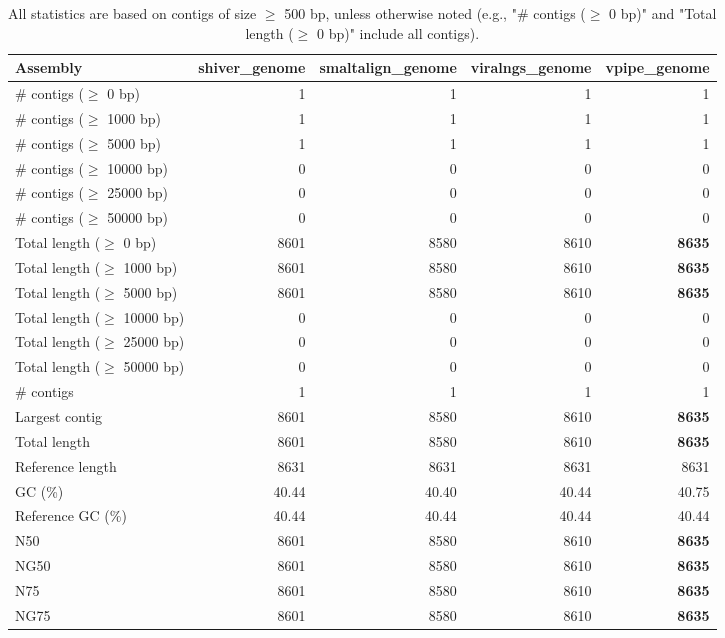 \documentclass[12pt,a4paper]{article}
\begin{document}
\begin{table}[ht]
\begin{center}
\caption{All statistics are based on contigs of size $\geq$ 500 bp, unless otherwise noted (e.g., "\# contigs ($\geq$ 0 bp)" and "Total length ($\geq$ 0 bp)" include all contigs).}
\begin{tabular}{|l*{4}{|r}|}
\hline
Assembly & shiver\_genome & smaltalign\_genome & viralngs\_genome & vpipe\_genome \\ \hline
\# contigs ($\geq$ 0 bp) & 1 & 1 & 1 & 1 \\ \hline
\# contigs ($\geq$ 1000 bp) & 1 & 1 & 1 & 1 \\ \hline
\# contigs ($\geq$ 5000 bp) & 1 & 1 & 1 & 1 \\ \hline
\# contigs ($\geq$ 10000 bp) & 0 & 0 & 0 & 0 \\ \hline
\# contigs ($\geq$ 25000 bp) & 0 & 0 & 0 & 0 \\ \hline
\# contigs ($\geq$ 50000 bp) & 0 & 0 & 0 & 0 \\ \hline
Total length ($\geq$ 0 bp) & 8601 & 8580 & 8610 & {\bf 8635} \\ \hline
Total length ($\geq$ 1000 bp) & 8601 & 8580 & 8610 & {\bf 8635} \\ \hline
Total length ($\geq$ 5000 bp) & 8601 & 8580 & 8610 & {\bf 8635} \\ \hline
Total length ($\geq$ 10000 bp) & 0 & 0 & 0 & 0 \\ \hline
Total length ($\geq$ 25000 bp) & 0 & 0 & 0 & 0 \\ \hline
Total length ($\geq$ 50000 bp) & 0 & 0 & 0 & 0 \\ \hline
\# contigs & 1 & 1 & 1 & 1 \\ \hline
Largest contig & 8601 & 8580 & 8610 & {\bf 8635} \\ \hline
Total length & 8601 & 8580 & 8610 & {\bf 8635} \\ \hline
Reference length & 8631 & 8631 & 8631 & 8631 \\ \hline
GC (\%) & 40.44 & 40.40 & 40.44 & 40.75 \\ \hline
Reference GC (\%) & 40.44 & 40.44 & 40.44 & 40.44 \\ \hline
N50 & 8601 & 8580 & 8610 & {\bf 8635} \\ \hline
NG50 & 8601 & 8580 & 8610 & {\bf 8635} \\ \hline
N75 & 8601 & 8580 & 8610 & {\bf 8635} \\ \hline
NG75 & 8601 & 8580 & 8610 & {\bf 8635} \\ \hline

\end{tabular}
\end{center}
\end{table}
\end{document}
